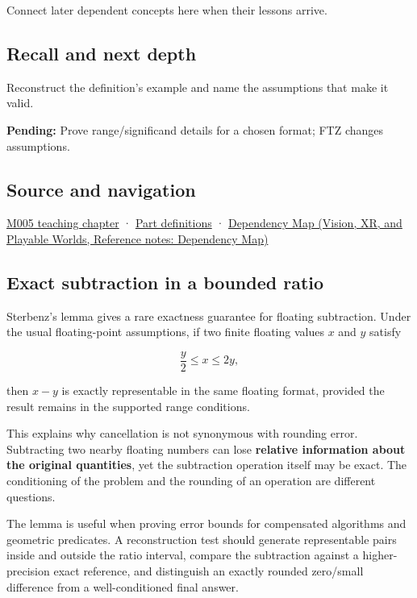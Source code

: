 \hypertarget{appendix-399b7ad53f39-used-by}{}

Connect later dependent concepts here when their lessons arrive.

\subsection{Recall and next depth}\label{appendix-399b7ad53f39-recall-and-next-depth}

\hypertarget{appendix-399b7ad53f39-recall-and-next-depth}{}

Reconstruct the definition's example and name the assumptions that make it valid.

\textbf{Pending:} Prove range/significand details for a chosen format; FTZ changes assumptions.

\subsection{Source and navigation}\label{appendix-399b7ad53f39-source-and-navigation}

\hypertarget{appendix-399b7ad53f39-source-and-navigation}{}

\hyperref[01-foundations-i-ch001-when-arithmetic-meets-uncertainty]{M005 teaching chapter} · \hyperref[appendix-fd090d982a15-m005---parts-77-88]{Part definitions} · \href{../07-Vision-XR-and-Playable-Worlds/main.pdf\#nameddest=appendix-4ad47bdd269a}{Dependency Map (Vision, XR, and Playable Worlds, Reference notes: Dependency Map)}

\subsection{Exact subtraction in a bounded ratio}\label{appendix-399b7ad53f39-exact-subtraction-in-a-bounded-ratio}

\hypertarget{appendix-399b7ad53f39-exact-subtraction-in-a-bounded-ratio}{}

Sterbenz's lemma gives a rare exactness guarantee for floating subtraction. Under the usual floating-point assumptions, if two finite floating values \(x\) and \(y\) satisfy

\[
\frac{y}{2} \le x \le 2y,
\]

then \(x-y\) is exactly representable in the same floating format, provided the result remains in the supported range conditions.

This explains why cancellation is not synonymous with rounding error. Subtracting two nearby floating numbers can lose \textbf{relative information about the original quantities}, yet the subtraction operation itself may be exact. The conditioning of the problem and the rounding of an operation are different questions.

The lemma is useful when proving error bounds for compensated algorithms and geometric predicates. A reconstruction test should generate representable pairs inside and outside the ratio interval, compare the subtraction against a higher-precision exact reference, and distinguish an exactly rounded zero/small difference from a well-conditioned final answer.
